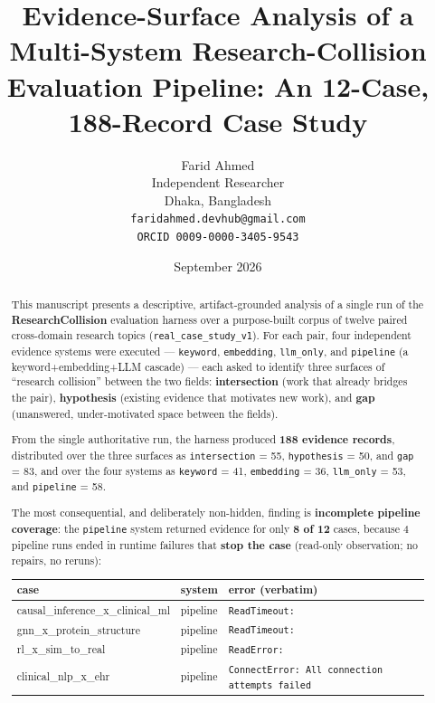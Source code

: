 \documentclass[11pt]{article}
\title{\textbf{Evidence-Surface Analysis of a Multi-System Research-Collision\\ Evaluation Pipeline: An 12-Case, 188-Record Case Study}}
\author{Farid Ahmed\\Independent Researcher\\Dhaka, Bangladesh\\\texttt{faridahmed.devhub@gmail.com}\\\texttt{ORCID 0009-0000-3405-9543}}
\date{September 2026}
\begin{document}
\maketitle
\clearpage

\begin{abstract}
\noindent
This manuscript presents a descriptive, artifact-grounded analysis of a single
run of the \textbf{ResearchCollision} evaluation harness over a purpose-built
corpus of twelve paired cross-domain research topics (\texttt{real\_case\_study\_v1}).
For each pair, four independent evidence systems were executed ---
\texttt{keyword}, \texttt{embedding}, \texttt{llm\_only}, and \texttt{pipeline}
(a keyword+embedding+LLM cascade) --- each asked to identify three surfaces of
``research collision'' between the two fields: \textbf{intersection} (work that
already bridges the pair), \textbf{hypothesis} (existing evidence that motivates
new work), and \textbf{gap} (unanswered, under-motivated space between the fields).

From the single authoritative run, the harness produced \textbf{188 evidence
records}, distributed over the three surfaces as \texttt{intersection} = 55,
\texttt{hypothesis} = 50, and \texttt{gap} = 83, and over the four systems as
\texttt{keyword} = 41, \texttt{embedding} = 36, \texttt{llm\_only} = 53, and
\texttt{pipeline} = 58.

The most consequential, and deliberately non-hidden, finding is \textbf{incomplete
pipeline coverage}: the \texttt{pipeline} system returned evidence for only
\textbf{8 of 12} cases, because 4 pipeline runs ended in runtime failures that
\textbf{stop the case} (read-only observation; no repairs, no reruns):

\begin{center}
\begin{tabular}{lll}
\toprule
\textbf{case} & \textbf{system} & \textbf{error (verbatim)} \\
\midrule
causal\_inference\_x\_clinical\_ml & pipeline & \texttt{ReadTimeout: } \\
gnn\_x\_protein\_structure & pipeline & \texttt{ReadTimeout: } \\
rl\_x\_sim\_to\_real & pipeline & \texttt{ReadError: } \\
clinical\_nlp\_x\_ehr & pipeline & \texttt{ConnectError: All connection attempts failed} \\
\bottomrule
\end{tabular}
\end{center}


\end{abstract}
\end{document}
